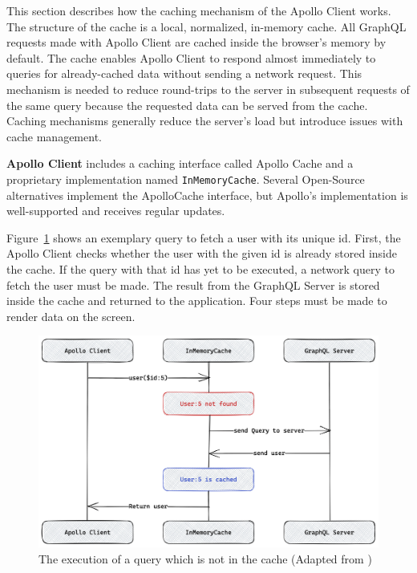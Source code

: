 This section describes how the caching mechanism of the Apollo Client works. The structure of the cache is a local, normalized, in-memory cache. All GraphQL requests made with Apollo Client are cached inside the browser's memory by default. The cache enables Apollo Client to respond almost immediately to queries for already-cached data without sending a network request. This mechanism is needed to reduce round-trips to the server in subsequent requests of the same query because the requested data can be served from the cache. \cite{misc:-:background:graphql:apollo-client-cache-overview} Caching mechanisms generally reduce the server's load but introduce issues with cache management.

\bigskip

\noindent \textbf{Apollo Client} includes a caching interface called Apollo Cache and a proprietary implementation named \texttt{InMemoryCache}. Several Open-Source alternatives implement the ApolloCache interface, but Apollo's implementation is well-supported and receives regular updates.

\bigskip

\noindent Figure~\ref{fig:background:graphql:user-query-first-time} shows an exemplary query to fetch a user with its unique id. First, the Apollo Client checks whether the user with the given id is already stored inside the cache. If the query with that id has yet to be executed, a network query to fetch the user must be made. The result from the GraphQL Server is stored inside the cache and returned to the application. Four steps must be made to render data on the screen. \cite{misc:-:background:graphql:apollo-client-cache-overview}

\ifshowImages
\begin{figure}[H]
    \centering
    \includegraphics[width=0.6\linewidth]{images/background/apollo/apollo-client-basic-cache.png}
    \caption{The execution of a query which is not in the cache (Adapted from \cite{misc:-:background:graphql:apollo-client-cache-overview})}\label{fig:background:graphql:user-query-first-time}
\end{figure}
\fi

